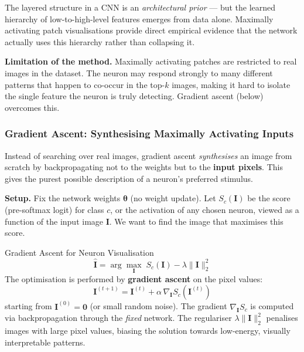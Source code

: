 \documentclass[11pt,a4paper]{article}
\begin{document}
\begin{insightbox}
The layered structure in a CNN is an \emph{architectural prior} — but the learned hierarchy of low-to-high-level features emerges from data alone.  Maximally activating patch visualisations provide direct empirical evidence that the network actually uses this hierarchy rather than collapsing it.
\end{insightbox}

\textbf{Limitation of the method.} Maximally activating patches are restricted to real images in the dataset.  The neuron may respond strongly to many different patterns that happen to co-occur in the top-$k$ images, making it hard to isolate the single feature the neuron is truly detecting.  Gradient ascent (below) overcomes this.

\subsubsection{Gradient Ascent: Synthesising Maximally Activating Inputs}

Instead of searching over real images, gradient ascent \emph{synthesises} an image from scratch by backpropagating not to the weights but to the \textbf{input pixels}. This gives the purest possible description of a neuron's preferred stimulus.

\textbf{Setup.} Fix the network weights $\boldsymbol{\theta}$ (no weight update).  Let $S_c(\mathbf{I})$ be the score (pre-softmax logit) for class $c$, or the activation of any chosen neuron, viewed as a function of the input image $\mathbf{I}$.  We want to find the image that maximises this score.

\begin{defbox}{Gradient Ascent for Neuron Visualisation}
\[
\hat{\mathbf{I}} = \arg\max_{\mathbf{I}}\; S_c(\mathbf{I}) - \lambda \|\mathbf{I}\|_2^2
\]
The optimisation is performed by \textbf{gradient ascent} on the pixel values:
\[
\mathbf{I}^{(t+1)} = \mathbf{I}^{(t)} + \alpha \,\nabla_{\mathbf{I}} S_c\!\left(\mathbf{I}^{(t)}\right)
\]
starting from $\mathbf{I}^{(0)} = \mathbf{0}$ (or small random noise).  The gradient $\nabla_{\mathbf{I}} S_c$ is computed via backpropagation through the \emph{fixed} network.  The regulariser $\lambda\|\mathbf{I}\|_2^2$ penalises images with large pixel values, biasing the solution towards low-energy, visually interpretable patterns.
\end{defbox}
\end{document}
